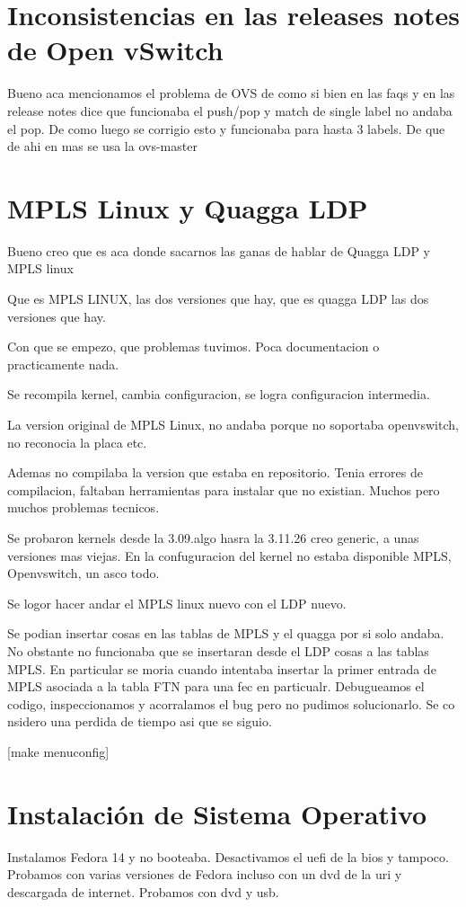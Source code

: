 \section{Inconsistencias en las releases notes de Open vSwitch}
Bueno aca mencionamos el problema de OVS de como si bien en las faqs y en las release notes dice que funcionaba el push/pop y match de single label no andaba el pop. De como luego se corrigio esto y funcionaba para hasta 3 labels. De que de ahi en mas se usa la ovs-master

\section{MPLS Linux y Quagga LDP}
Bueno creo que es aca donde sacarnos las ganas de hablar de Quagga LDP y MPLS linux

Que es MPLS LINUX, las dos versiones que hay, que es quagga LDP las dos versiones que hay.

Con que se empezo, que problemas tuvimos. Poca documentacion o practicamente nada.

Se recompila kernel, cambia configuracion, se logra configuracion intermedia.

La version original de MPLS Linux, no andaba porque no soportaba openvswitch, no reconocia la placa etc.

Ademas no compilaba la version que estaba en repositorio. Tenia errores de compilacion, faltaban herramientas para instalar que no existian. Muchos pero muchos problemas tecnicos.

Se probaron kernels desde la 3.09.algo hasra la 3.11.26 creo generic, a unas versiones mas viejas. En la confuguracion del kernel no estaba disponible MPLS, Openvswitch, un asco todo.

Se logor hacer andar el MPLS linux nuevo con el LDP nuevo.

Se podian insertar cosas en las tablas de MPLS y el quagga por si solo andaba. No obstante no funcionaba que se insertaran desde el LDP cosas a las tablas MPLS. En particular se moria cuando intentaba insertar la primer entrada de MPLS asociada a la tabla FTN para una fec en particualr. Debugueamos el codigo, inspeccionamos y acorralamos el bug pero no pudimos solucionarlo. Se co nsidero una perdida de tiempo asi que se siguio.

[make menuconfig]

\section{Instalaci\'on de Sistema Operativo}
Instalamos Fedora 14 y no booteaba. Desactivamos el uefi de la bios y tampoco. Probamos con varias versiones de Fedora incluso con un dvd de la uri y descargada de internet. Probamos con dvd y usb.

